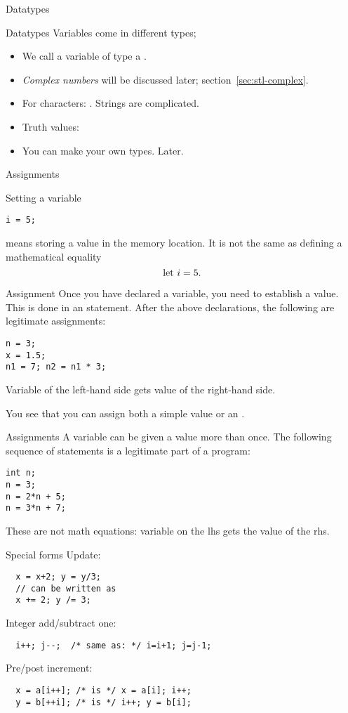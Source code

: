  {Datatypes}

\begin{block}{Datatypes}
  \label{sl:datatypes}
  Variables come in different types;
  \begin{itemize}
  \item We call a variable of type
     a .
  \item \emph{Complex numbers} will be
    discussed later; section~\ref{sec:stl-complex}.
  \item 
    For characters: . Strings are complicated.
  \item Truth values: 
  \item 
    You can make your own types. Later.
  \end{itemize}
\end{block}

 {Assignments}
\label{sec:ctypes}

Setting a variable
\begin{verbatim}
i = 5;
\end{verbatim}
means storing a value in the memory location. It is
not the same as defining a mathematical equality
\[ \hbox{let $i=5$}. \]

\begin{block}{Assignment}
  \label{sl:assign1}
  Once you have declared a variable, you need to establish a value. This is done in an
   statement. After the above declarations, the
  following are legitimate assignments:
\begin{verbatim}
n = 3;
x = 1.5;
n1 = 7; n2 = n1 * 3;
\end{verbatim}
Variable of the left-hand side gets value of the right-hand side.

You see that you can assign both a simple value or an
.
\end{block}

\begin{block}{Assignments}
  \label{sl:assign2}
  A variable can be given a value more than once. The following
  sequence of statements is a legitimate part of a program:
\begin{verbatim}
int n;
n = 3;
n = 2*n + 5;
n = 3*n + 7;
\end{verbatim}
These are not math equations: variable on the lhs gets the value of
the rhs.
\end{block}

\begin{block}{Special forms}
  \label{sl:special-assign}
  Update:
\begin{verbatim}
  x = x+2; y = y/3;
  // can be written as
  x += 2; y /= 3;
\end{verbatim}
Integer add/subtract one:
\begin{verbatim}
  i++; j--;  /* same as: */ i=i+1; j=j-1;
\end{verbatim}
  Pre/post increment:
\begin{verbatim}
  x = a[i++]; /* is */ x = a[i]; i++;
  y = b[++i]; /* is */ i++; y = b[i];
\end{verbatim}
\end{block}

